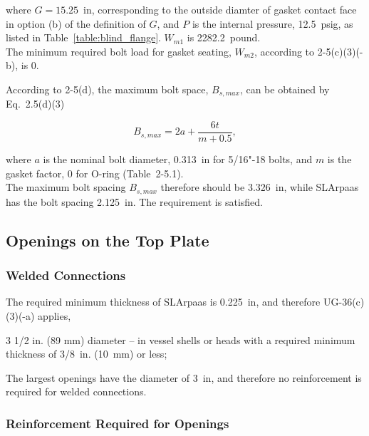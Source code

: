 where $G = 15.25$~in, corresponding to the outside diamter of gasket contact
face in option (b) of the definition of $G$,
and $P$ is the internal pressure, 12.5~psig, as listed in 
Table~\ref{table:blind_flange}.
$W_{m1}$ is 2282.2~pound.\\

The minimum required bolt load for gasket seating, $W_{m2}$, according to
2-5(c)(3)(-b), is 0.

According to 2-5(d), the maximum bolt space, $B_{s,max}$, can be obtained
by Eq.~2.5(d)(3)

\begin{equation}
    B_{s,max} = 2a + \frac{6t}{m+0.5},
\end{equation}

where $a$ is the nominal bolt diameter, 0.313~in for 5/16"-18 bolts,
and $m$ is the gasket factor, 0 for O-ring (Table~2-5.1).\\

The maximum bolt spacing $B_{s,max}$ therefore should be 3.326~in,
while SLArpaas has the bolt spacing 2.125~in.
The requirement is satisfied.

\subsection{Openings on the Top Plate}
\label{app:openings}

\subsubsection{Welded Connections}
\label{app:welded}

The required minimum thickness of SLArpaas is 0.225~in, and therefore
UG-36(c)(3)(-a) applies,

\begin{displayquote}
    3 1/2 in. (89 mm) diameter -- in vessel shells or heads with a 
    required minimum thickness of 3/8~in. (10~mm) or less;
\end{displayquote}

The largest openings have the diameter of 3~in, 
and therefore no reinforcement is required for welded connections.

\subsubsection{Reinforcement Required for Openings}
\label{app:opening_reinforcement}

